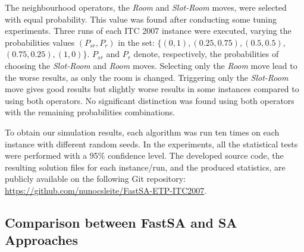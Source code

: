 The neighbourhood operators, the \textit{Room} and \textit{Slot-Room} moves, were selected with equal probability. This value was found after conducting some tuning experiments. Three runs of each ITC 2007 instance were executed, varying the probabilities values $(P_{sr}, P_{r})$ in the set: $\{ (0,1), (0.25, 0.75), (0.5,0.5),$ $(0.75,0.25), (1,0)\}$. $P_{sr}$ and $P_{r}$ denote, respectively, the probabilities of choosing the \textit{Slot-Room} and \textit{Room} moves. Selecting only the \textit{Room} move lead to the worse results, as only the room is changed. Triggering only the \textit{Slot-Room} move gives good results but slightly worse results in some instances compared to using both operators. No significant distinction was found using both operators  with the remaining probabilities combinations.


To obtain our simulation results, each algorithm was run ten times on each instance with different random seeds. In the experiments, all the statistical tests were performed with a 95\% confidence level. The developed source code, the resulting solution files for each instance/run, and the produced statistics, are publicly available on the following Git repository: \url{https://github.com/nunocsleite/FastSA-ETP-ITC2007}.





\subsection{Comparison between FastSA and SA Approaches}
\label{subsec:ComparisonBetweenSAandFastSA}

